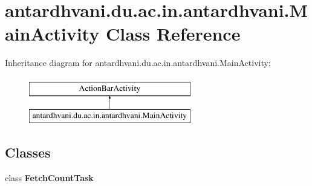 \hypertarget{classantardhvani_1_1du_1_1ac_1_1in_1_1antardhvani_1_1_main_activity}{}\section{antardhvani.\+du.\+ac.\+in.\+antardhvani.\+Main\+Activity Class Reference}
\label{classantardhvani_1_1du_1_1ac_1_1in_1_1antardhvani_1_1_main_activity}
Inheritance diagram for antardhvani.\+du.\+ac.\+in.\+antardhvani.\+Main\+Activity\+:\begin{figure}[H]
\begin{center}
\leavevmode
\includegraphics[height=2.000000cm]{classantardhvani_1_1du_1_1ac_1_1in_1_1antardhvani_1_1_main_activity}
\end{center}
\end{figure}
\subsection*{Classes}
\begin{DoxyCompactItemize}
\item 
class {\bfseries Fetch\+Count\+Task}
\end{DoxyCompactItemize}
